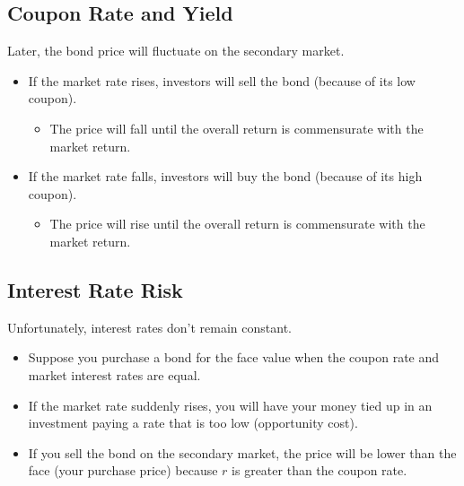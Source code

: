 \documentclass[letterpaper,10pt,english]{sphinxmanual}
\begin{document}
\subsection{Coupon Rate and Yield}
\label{bondPrices:id14}
Later, the bond price will fluctuate on the secondary market.
\begin{itemize}
\item {} 
If the market rate rises, investors will sell the bond (because of
its low coupon).
\begin{itemize}
\item {} 
The price will fall until the overall return is commensurate with
the market return.

\end{itemize}

\end{itemize}
\begin{itemize}
\item {} 
If the market rate falls, investors will buy the bond
(because of its high coupon).
\begin{itemize}
\item {} 
The price will rise until the overall return is commensurate with
the market return.

\end{itemize}

\end{itemize}


\subsection{Interest Rate Risk}
\label{bondPrices:interest-rate-risk}
Unfortunately, interest rates don't remain constant.
\begin{itemize}
\item {} 
Suppose you purchase a bond for the face value when the coupon rate
and market interest rates are equal.

\end{itemize}
\begin{itemize}
\item {} 
If the market rate suddenly rises, you will have your money tied up
in an investment paying a rate that is too low (opportunity cost).

\end{itemize}
\begin{itemize}
\item {} 
If you sell the bond on the secondary market, the price will be
lower than the face (your purchase price) because $r$ is
greater than the coupon rate.

\end{itemize}
\end{document}
